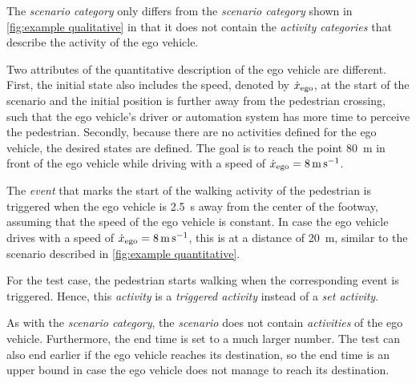 The \textit{scenario category} only differs from the \textit{scenario category} shown in \cref{fig:example qualitative} in that it does not contain the \textit{activity categories} that describe the activity of the ego vehicle.

Two attributes of the quantitative description of the ego vehicle are different. First, the initial state also includes the speed, denoted by $\dot{x}_{\mathrm{ego}}$, at the start of the scenario and \cbstartd the initial position is further away from the pedestrian crossing, such that the ego vehicle's driver or automation system has more time to perceive the pedestrian. 
\cbend
\cbstart
Secondly, because there are no activities defined for the ego vehicle, the desired states are defined. The goal is to reach the point \SI{80}{\meter} in front of the ego vehicle while driving with a speed of $\dot{x}_{\mathrm{ego}}=\SI{8}{\meter\per\second}$.

The \textit{event} that marks the start of the walking activity of the pedestrian is triggered when the ego vehicle is \SI{2.5}{\second} away from the center of the footway, assuming that the speed of the ego vehicle is constant. In case the ego vehicle drives with a speed of $\dot{x}_{\mathrm{ego}}=\SI{8}{\meter\per\second}$, this is at a distance of \SI{20}{\meter}, similar to the scenario described in \cref{fig:example quantitative}.

For the test case, the pedestrian starts walking when the corresponding event is triggered. Hence, this \textit{activity} is a \textit{triggered activity} instead of a \textit{set activity}.

As with the \textit{scenario category}, the \textit{scenario} does not contain \textit{activities} of the ego vehicle. Furthermore, the end time is set to a much larger number. The test can also end earlier if the ego vehicle reaches its destination, so the end time is an upper bound in case the ego vehicle does not manage to reach its destination.
\cbend
